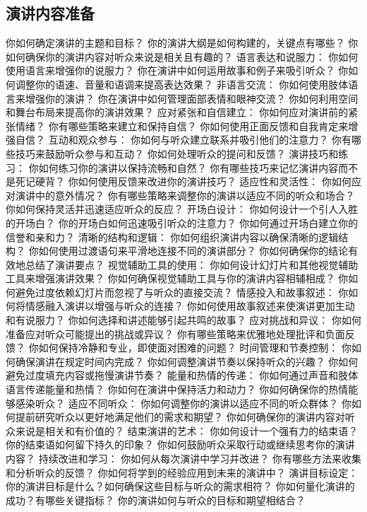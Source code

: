 \documentclass[12pt]{book}
\begin{document}
\subsection{演讲内容准备}
你如何确定演讲的主题和目标？
你的演讲大纲是如何构建的，关键点有哪些？
你如何确保你的演讲内容对听众来说是相关且有趣的？
语言表达和说服力：
你如何使用语言来增强你的说服力？
你在演讲中如何运用故事和例子来吸引听众？
你如何调整你的语速、音量和语调来提高表达效果？
非语言交流：
你如何使用肢体语言来增强你的演讲？
你在演讲中如何管理面部表情和眼神交流？
你如何利用空间和舞台布局来提高你的演讲效果？
应对紧张和自信建立：
你如何应对演讲前的紧张情绪？
你有哪些策略来建立和保持自信？
你如何使用正面反馈和自我肯定来增强自信？
互动和观众参与：
你如何与听众建立联系并吸引他们的注意力？
你有哪些技巧来鼓励听众参与和互动？
你如何处理听众的提问和反馈？
演讲技巧和练习：
你如何练习你的演讲以保持流畅和自然？
你有哪些技巧来记忆演讲内容而不是死记硬背？
你如何使用反馈来改进你的演讲技巧？
适应性和灵活性：
你如何应对演讲中的意外情况？
你有哪些策略来调整你的演讲以适应不同的听众和场合？
你如何保持灵活并迅速适应听众的反应？
开场白设计：
你如何设计一个引人入胜的开场白？
你的开场白如何迅速吸引听众的注意力？
你如何通过开场白建立你的信誉和亲和力？
清晰的结构和逻辑：
你如何组织演讲内容以确保清晰的逻辑结构？
你如何使用过渡语句来平滑地连接不同的演讲部分？
你如何确保你的结论有效地总结了演讲要点？
视觉辅助工具的使用：
你如何设计幻灯片和其他视觉辅助工具来增强演讲效果？
你如何确保视觉辅助工具与你的演讲内容相辅相成？
你如何避免过度依赖幻灯片而忽视了与听众的直接交流？
情感投入和故事叙述：
你如何将情感融入演讲以增强与听众的连接？
你如何使用故事叙述来使演讲更加生动和有说服力？
你如何选择和讲述能够引起共鸣的故事？
应对挑战和异议：
你如何准备应对听众可能提出的挑战或异议？
你有哪些策略来优雅地处理批评和负面反馈？
你如何保持冷静和专业，即使面对困难的问题？
时间管理和节奏控制：
你如何确保演讲在规定时间内完成？
你如何调整演讲节奏以保持听众的兴趣？
你如何避免过度填充内容或拖慢演讲节奏？
能量和热情的传递：
你如何通过声音和肢体语言传递能量和热情？
你如何在演讲中保持活力和动力？
你如何确保你的热情能够感染听众？
适应不同听众：
你如何调整你的演讲以适应不同的听众群体？
你如何提前研究听众以更好地满足他们的需求和期望？
你如何确保你的演讲内容对听众来说是相关和有价值的？
结束演讲的艺术：
你如何设计一个强有力的结束语？
你的结束语如何留下持久的印象？
你如何鼓励听众采取行动或继续思考你的演讲内容？
持续改进和学习：
你如何从每次演讲中学习并改进？
你有哪些方法来收集和分析听众的反馈？
你如何将学到的经验应用到未来的演讲中？
演讲目标设定：
你的演讲目标是什么？如何确保这些目标与听众的需求相符？
你如何量化演讲的成功？有哪些关键指标？
你的演讲如何与听众的目标和期望相结合？
\end{document}
